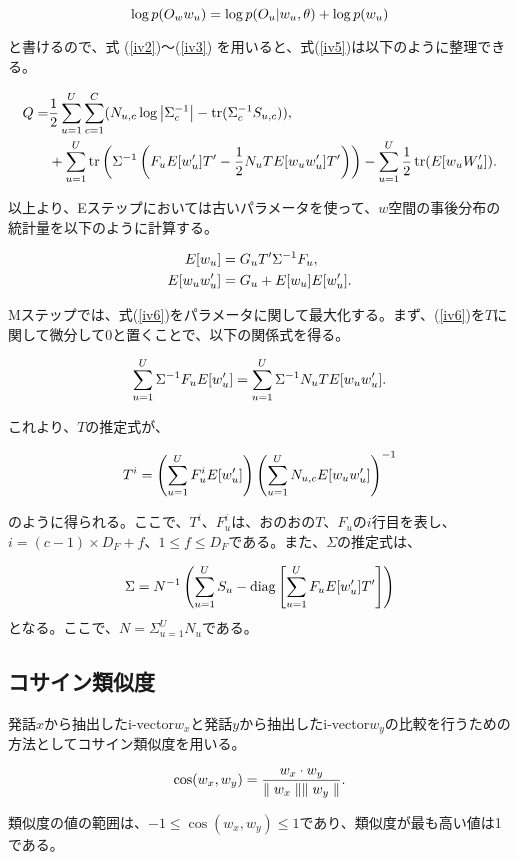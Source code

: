 \begin{equation}
\log p(O_w w_u)=\log p(O_u|w_u,\theta)+\log p(w_u) \notag
\end{equation}

と書けるので、式 (\ref{iv2})〜(\ref{iv3}) を用いると、式(\ref{iv5})は以下のように整理できる。

\begin{align}
Q=&\frac{1}{2}\sum_{u=1}^{U}\sum_{c=1}^{C}(N_{u,c} \log\left|\Sigma_c^{-1}\right|-\tr(\Sigma_c^{-1}S_{u,c})), \notag  \\
&+\sum_{u=1}^{U}\tr\left( \Sigma^{-1}\left( F_uE[w_u^\prime]T^\prime -\frac{1}{2}N_uTE[w_uw_u^\prime]T^\prime \right) \right) -\sum_{u=1}^{U}\frac{1}{2}\tr(E[w_uW_u^\prime]). \label{iv6}
\end{align}

以上より、Eステップにおいては古いパラメータを使って、$w$空間の事後分布の統計量を以下のように計算する。

\begin{align}
E[w_u] &=G_uT^\prime\Sigma^{-1}F_u, \notag \\
E[w_uw_u^\prime] &=G_u+E[w_u]E[w_u^\prime]. \notag
\end{align}

Mステップでは、式(\ref{iv6})をパラメータに関して最大化する。まず、(\ref{iv6})を$T$に関して微分して0と置くことで、以下の関係式を得る。

\begin{equation}
\sum_{u=1}^{U}\Sigma^{-1}F_uE[w_u^\prime]=\sum_{u=1}^{U}\Sigma^{-1}N_uTE[w_uw_u^\prime]. \notag
\end{equation}

これより、$T$の推定式が、

\begin{equation}
T^i=\left(\sum_{u=1}^{U}F_u^iE[w_u^\prime] \right)\left(\sum_{u=1}^{U}N_{u,c}E[w_uw_u^\prime] \right)^{-1} \notag
\end{equation}

のように得られる。ここで、$T^i$、$F_u^i$は、おのおの$T$、$F_u$の$i$行目を表し、$i=(c-1)\times D_F+f$、$1\leq f\leq D_F$である。また、$\Sigma$の推定式は、

\begin{equation}
\Sigma=N^{-1}\left(\sum_{u=1}^{U}S_u-\diag\left[\sum_{u=1}^{U}F_uE[w_u^\prime]T^\prime \right] \right) \notag
\end{equation}
となる。ここで、$N=\Sigma_{u=1}^{U}N_u$である。

\subsection{コサイン類似度}
発話$x$から抽出したi-vector$w_x$と発話$y$から抽出したi-vector$w_y$の比較を行うための方法としてコサイン類似度を用いる。

\begin{equation}
\cos(w_x,w_y)=\frac{w_x\cdot w_y}{\parallel w_x\parallel\parallel w_y\parallel}. \notag
\end{equation}

類似度の値の範囲は、$-1\leq \cos(w_x,w_y)\leq 1$であり、類似度が最も高い値は1である。

